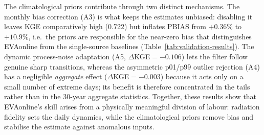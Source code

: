 The climatological priors contribute through two distinct mechanisms. The
monthly bias correction (A3) is what keeps the estimates unbiased: disabling it
leaves KGE comparatively high (0.722) but inflates PBIAS from $+0.36\%$ to
$+10.9\%$, i.e.\ the priors are responsible for the near-zero bias that
distinguishes EVAonline from the single-source baselines
(Table~\ref{tab:validation-results}). The dynamic process-noise adaptation (A5,
$\Delta$KGE${}=-0.106$) lets the filter follow genuine sharp transitions, whereas
the asymmetric p01/p99 outlier rejection (A4) has a negligible \emph{aggregate}
effect ($\Delta$KGE${}=-0.003$) because it acts only on a small number of
extreme days; its benefit is therefore concentrated in the tails rather than in
the 30-year aggregate statistics. Together, these results show that EVAonline's
skill arises from a physically meaningful division of labour: radiation fidelity
sets the daily dynamics, while the climatological priors remove bias and
stabilise the estimate against anomalous inputs.
